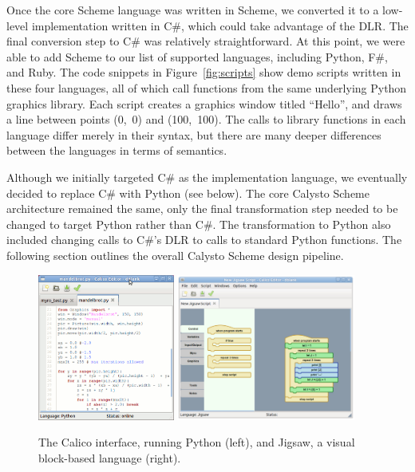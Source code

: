 \documentclass[acmsmall,screen,anonymous,review]{acmart}
\begin{document}
Once the core Scheme language was written in Scheme, we converted it to a
low-level implementation written in C\#, which could take advantage of the
DLR. The final conversion step to C\# was relatively straightforward. At this
point, we were able to add Scheme to our list of supported languages, including
Python, F\#, and Ruby.  The code snippets in Figure~\ref{fig:scripts} show demo
scripts written in these four languages, all of which call functions from the
same underlying Python graphics library. Each script creates a graphics window
titled ``Hello'', and draws a line between points (0,~0) and (100,~100). The
calls to library functions in each language differ merely in their syntax, but
there are many deeper differences between the languages in terms of semantics.

Although we initially targeted C\# as the implementation language, we
eventually decided to replace C\# with Python (see below). The core Calysto
Scheme architecture remained the same, only the final transformation step
needed to be changed to target Python rather than C\#. The transformation to
Python also included changing calls to C\#'s DLR to calls to standard Python
functions. The following section outlines the overall Calysto Scheme design
pipeline.


\begin{figure}
  \centering
  \includegraphics[width=0.40\textwidth]{calico-interface-python.jpg}
  \hspace{0.15in}
  \includegraphics[width=0.523\textwidth]{calico-interface-jigsaw.jpg}
  \caption{The Calico interface, running Python (left),
    and Jigsaw, a visual block-based language (right).}
  \label{fig:calico}
\end{figure}
\end{document}
